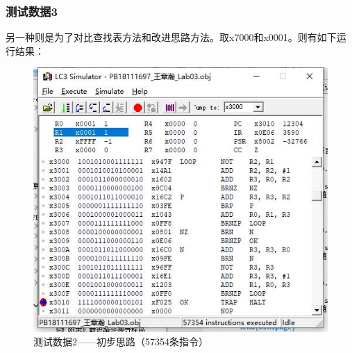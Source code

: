 \documentclass[UTF8]{article}
\begin{document}
	\subsubsection{测试数据3}
	另一种则是为了对比查找表方法和改进思路方法。取x7000和x0001。则有如下运行结果：\par
	\begin{figure}[H]
		\begin{minipage}[H]{0.48\linewidth}
			\centering
			\includegraphics[scale=0.45]{data3_2.jpg}
			\caption{测试数据2——初步思路（57354条指令）}
			\label{data3_2}
		\end{minipage}
		\qquad
		\begin{minipage}[H]{0.48\linewidth}
			\centering

\end{minipage}
\end{figure}
\end{document}
